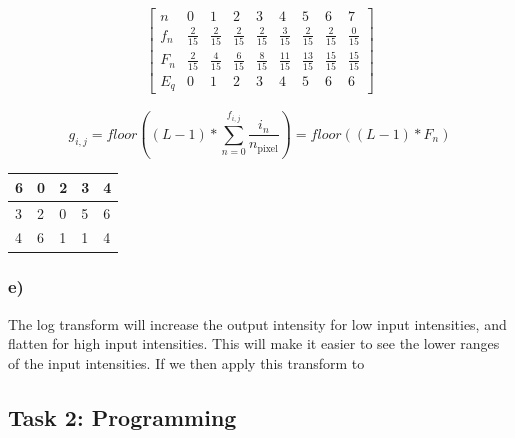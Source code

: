 \begin{align*}
    \begin{bmatrix}
        n   & 0             & 1             & 2             & 3             & 4             & 5             & 6             & 7 \\ \hline
        f_n &\frac{2}{15} &\frac{2}{15} &\frac{2}{15} &\frac{2}{15} &\frac{3}{15} &\frac{2}{15} &\frac{2}{15} &\frac{0}{15} \\
        F_n &\frac{2}{15} &\frac{4}{15} &\frac{6}{15} &\frac{8}{15} &\frac{11}{15} &\frac{13}{15} &\frac{15}{15} &\frac{15}{15} \\
        E_q & 0 & 1 & 2 & 3 & 4 & 5 & 6 & 6
    \end{bmatrix}
\end{align*}

\begin{equation}
    \label{eq:equalizer}
    g_{i,j} = floor((L - 1) * \sum_{n = 0}^{f_{i,j}} \frac{i_n}{n_{\text{pixel}}}) = floor((L - 1) * F_n)
\end{equation}

\begin{table}[]
    \label{tab:equalized_image}
    \begin{tabular}{|l|l|l|l|l|}
        \hline
        6 & 0 & 2 & 3 & 4 \\ \hline
        3 & 2 & 0 & 5 & 6 \\ \hline
        4 & 6 & 1 & 1 & 4 \\ \hline
    \end{tabular}
\end{table}

\subsubsection*{e)}
The log transform will increase the output intensity for low input intensities, and flatten for high input intensities. This will make it easier to see the lower ranges of the input intensities. If we then apply this transform to 


\newpage
\subsection{Task 2: Programming}

